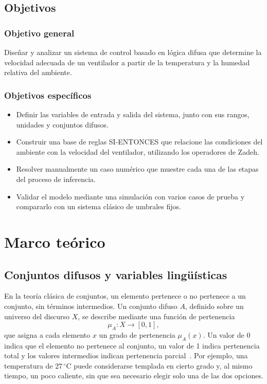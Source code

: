 \documentclass[11pt]{article}
\begin{document}
\subsection{Objetivos}

\subsubsection*{Objetivo general}

Diseñar y analizar un sistema de control basado en lógica difusa que determine la velocidad adecuada de un ventilador a partir de la temperatura y la humedad relativa del ambiente.

\subsubsection*{Objetivos específicos}

\begin{itemize}
  \item Definir las variables de entrada y salida del sistema, junto con sus rangos, unidades y conjuntos difusos.
  \item Construir una base de reglas SI-ENTONCES que relacione las condiciones del ambiente con la velocidad del ventilador, utilizando los operadores de Zadeh.
  \item Resolver manualmente un caso numérico que muestre cada una de las etapas del proceso de inferencia.
  \item Validar el modelo mediante una simulación con varios casos de prueba y compararlo con un sistema clásico de umbrales fijos.
\end{itemize}

\section{Marco teórico}

\subsection{Conjuntos difusos y variables lingüísticas}

En la teoría clásica de conjuntos, un elemento pertenece o no pertenece a un conjunto, sin términos intermedios. Un conjunto difuso $A$, definido sobre un universo del discurso $X$, se describe mediante una función de pertenencia
\[
\mu_A : X \to [0, 1],
\]
que asigna a cada elemento $x$ un grado de pertenencia $\mu_A(x)$. Un valor de 0 indica que el elemento no pertenece al conjunto, un valor de 1 indica pertenencia total y los valores intermedios indican pertenencia parcial~\cite{zadeh1965}. Por ejemplo, una temperatura de $27\,^\circ$C puede considerarse templada en cierto grado y, al mismo tiempo, un poco caliente, sin que sea necesario elegir solo una de las dos opciones.
\end{document}
